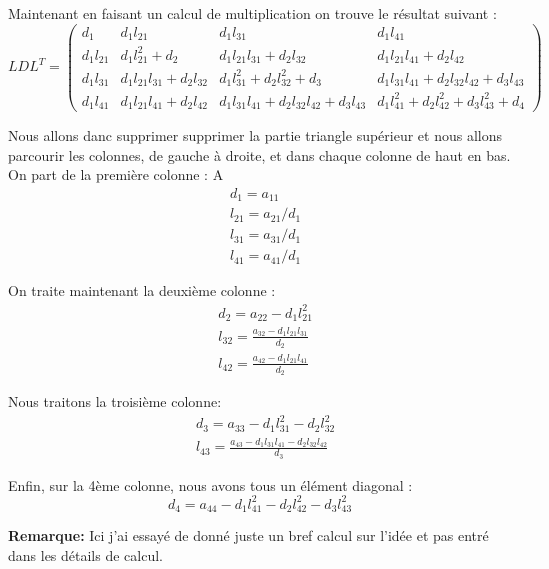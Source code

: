 \documentclass[12pt]{report}
\begin{document}
Maintenant en faisant un calcul de multiplication on trouve le résultat suivant : \\
$$
L D L^{T}=\left(\begin{array}{cccc}
d_{1} & d_{1} l_{21} & d_{1} l_{31} & d_{1} l_{41} \\
d_{1} l_{21} & d_{1} l_{21}^{2}+d_{2} & d_{1} l_{21} l_{31}+d_{2} l_{32} & d_{1} l_{21} l_{41}+d_{2} l_{42} \\
d_{1} l_{31} & d_{1} l_{21} l_{31}+d_{2} l_{32} & d_{1} l_{31}^{2}+d_{2} l_{32}^{2}+d_{3} & d_{1} l_{31} l_{41}+d_{2} l_{32} l_{42}+d_{3} l_{43} \\
d_{1} l_{41} & d_{1} l_{21} l_{41}+d_{2} l_{42} & d_{1} l_{31} l_{41}+d_{2} l_{32} l_{42}+d_{3} l_{43} & d_{1} l_{41}^{2}+d_{2} l_{42}^{2}+d_{3} l_{43}^{2}+d_{4}
\end{array}\right)
$$

Nous allons danc supprimer supprimer la partie triangle supérieur et nous allons parcourir les colonnes, de gauche à droite, et dans chaque colonne de haut en bas.\\

On part de la première colonne : $\mathrm{A}$
$$
\begin{aligned}
&d_{1}=a_{11} \\
&l_{21}=a_{21} / d_{1} \\
&l_{31}=a_{31} / d_{1} \\
&l_{41}=a_{41} / d_{1}
\end{aligned}
$$

On traite maintenant la deuxième colonne :
$$
\begin{aligned}
&d_{2}=a_{22}-d_{1} l_{21}^{2} \\
&l_{32}=\frac{a_{32}-d_{1} l_{21} l_{31}}{d_{2}} \\
&l_{42}=\frac{a_{42}-d_{1} l_{21} l_{41}}{d_{2}}
\end{aligned}
$$


Nous traitons la troisième colonne: 
$$
\begin{aligned}
&d_{3}=a_{33}-d_{1} l_{31}^{2}-d_{2} l_{32}^{2} \\
&l_{43}=\frac{a_{43}-d_{1} l_{31} l_{41}-d_{2} l_{32} l_{42}}{d_{3}}
\end{aligned}
$$

Enfin, sur la 4ème colonne, nous avons tous un élément diagonal :
$$
d_{4}=a_{44}-d_{1} l_{41}^{2}-d_{2} l_{42}^{2}-d_{3} l_{43}^{2}
$$

\textbf{Remarque:}
Ici j'ai essayé de donné juste un bref calcul sur l'idée et pas entré dans les détails de calcul.\\
\end{document}
